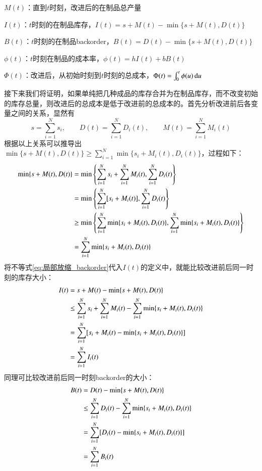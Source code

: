 $M(t)$：直到$t$时刻，改进后的在制品总产量

$I(t)$：$t$时刻的在制品库存，$I(t)=s+M(t)-\min\{s+M(t),D(t)\}$

$B(t)$：$t$时刻的在制品backorder，$B(t)=D(t)-\min\{s+M(t),D(t)\}$

$\phi(t)$：$t$时刻在制品的成本率，$\phi(t)=hI(t)+bB(t)$

$\Phi(t)$：改进后，从初始时刻到$t$时刻的总成本，$\Phi(t)=\int_0^t\phi(u)\operatorname{d\!} u$

接下来我们将证明，如果单纯把几种成品的库存合并为在制品库存，而不改变初始的库存总量，则改进后的总成本是低于改进前的总成本的。首先分析改进前后各变量之间的关系，显然有
\begin{equation}
s = \sum_{i=1}^N s_i,\qquad D(t) = \sum_{i=1}^N D_i(t),\qquad M(t) = \sum_{i=1}^N M_i(t)
\label{eq:改进前后的基本关系_backorder}
\end{equation}
根据以上关系可以推导出$\min\{s+M(t),D(t)\}\geq\sum_{i=1}^N\min\{s_i+M_i(t),D_i(t)\}$，过程如下：
\begin{align}
\min\{s+M(t),D(t)\} &= \min\left\{\sum_{i=1}^N s_i+\sum_{i=1}^N M_i(t),\sum_{i=1}^N D_i(t)\right\} \notag \\
&= \min\left\{\sum_{i=1}^N [s_i+M_i(t)],\sum_{i=1}^N D_i(t)\right\} \notag \\
&\geq \min\left\{\sum_{i=1}^N\min\{s_i+M_i(t),D_i(t)\},\sum_{i=1}^N\min\{s_i+M_i(t),D_i(t)\}\right\} \notag \\
&= \sum_{i=1}^N\min\{s_i+M_i(t),D_i(t)\}
\label{eq:局部放缩_backorder}
\end{align}
将不等式\ref{eq:局部放缩_backorder}代入$I(t)$的定义中，就能比较改进前后同一时刻的库存大小：
\begin{align}
I(t) &= s+M(t)-\min\{s+M(t),D(t)\} \notag \\
&\leq \sum_{i=1}^N s_i + \sum_{i=1}^N M_i(t) - \sum_{i=1}^N\min\{s_i+M_i(t),D_i(t)\} \notag \\
&= \sum_{i=1}^N [s_i+M_i(t)-\min\{s_i+M_i(t),D_i(t)\}] \notag \\
&= \sum_{i=1}^N I_i(t)
\label{eq:改进前后同一时刻库存比较_backorder}
\end{align}
同理可比较改进前后同一时刻backorder的大小：
\begin{align}
B(t) &= D(t)-\min\{s+M(t),D(t)\} \notag \\
&\leq \sum_{i=1}^N D_i(t) - \sum_{i=1}^N\min\{s_i+M_i(t),D_i(t)\} \notag \\
&= \sum_{i=1}^N [D_i(t)-\min\{s_i+M_i(t),D_i(t)\}] \notag \\
&= \sum_{i=1}^N B_i(t)
\label{eq:改进前后同一时刻backorder比较_backorder}
\end{align}
